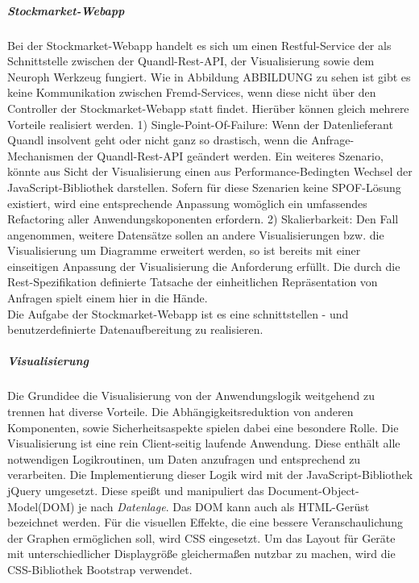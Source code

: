 \subparagraph{Stockmarket-Webapp}
Bei der Stockmarket-Webapp handelt es sich um einen Restful-Service der als Schnittstelle zwischen der Quandl-Rest-API, der Visualisierung sowie dem Neuroph Werkzeug fungiert. Wie in Abbildung ABBILDUNG zu sehen ist gibt es keine Kommunikation zwischen Fremd-Services, wenn diese nicht über den Controller der Stockmarket-Webapp statt findet. Hierüber können gleich mehrere Vorteile realisiert werden. 
1) Single-Point-Of-Failure: Wenn der Datenlieferant Quandl insolvent geht oder nicht ganz so drastisch, wenn die Anfrage-Mechanismen der Quandl-Rest-API geändert werden. Ein weiteres Szenario, könnte aus Sicht der Visualisierung einen aus Performance-Bedingten Wechsel der JavaScript-Bibliothek darstellen. Sofern für diese Szenarien keine SPOF-Lösung existiert, wird eine entsprechende Anpassung womöglich ein umfassendes Refactoring aller Anwendungskoponenten erfordern. 
2) Skalierbarkeit: Den Fall angenommen, weitere Datensätze sollen an andere Visualisierungen bzw. die Visualisierung um Diagramme erweitert werden, so ist bereits mit einer einseitigen Anpassung der Visualisierung die Anforderung erfüllt. Die durch die Rest-Spezifikation definierte Tatsache der einheitlichen Repräsentation von Anfragen spielt einem hier in die Hände. \\
Die Aufgabe der Stockmarket-Webapp ist es eine schnittstellen - und benutzerdefinierte Datenaufbereitung zu realisieren. 

\subparagraph{Visualisierung}
Die Grundidee die Visualisierung von der Anwendungslogik weitgehend zu trennen hat diverse Vorteile. Die Abhängigkeitsreduktion von anderen Komponenten, sowie Sicherheitsaspekte spielen dabei eine besondere Rolle. 
Die Visualisierung ist eine rein Client-seitig laufende Anwendung. Diese enthält alle notwendigen Logikroutinen, um Daten anzufragen und entsprechend zu verarbeiten. Die Implementierung dieser Logik wird mit der JavaScript-Bibliothek jQuery umgesetzt. Diese speißt und manipuliert das Document-Object-Model(DOM) je nach \emph{Datenlage}. Das DOM kann auch als HTML-Gerüst bezeichnet werden. Für die visuellen Effekte, die eine bessere Veranschaulichung der Graphen ermöglichen soll, wird CSS eingesetzt. Um das Layout für Geräte mit unterschiedlicher Displaygröße gleichermaßen nutzbar zu machen, wird die CSS-Bibliothek Bootstrap verwendet. 

